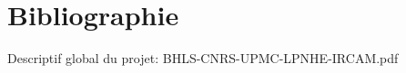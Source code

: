 \documentclass[french,a4paper,12pt]{report}
\begin{document}
%
%
%
%
%
%
%
%
%
%
%


\part{Bibliographie}

Descriptif global du projet:
BHLS-CNRS-UPMC-LPNHE-IRCAM.pdf
\end{document}
